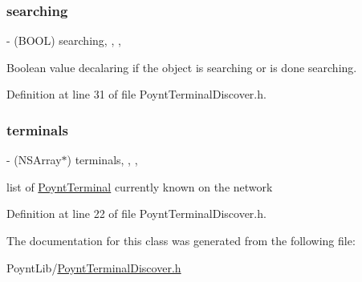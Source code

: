 \subsubsection{\texorpdfstring{searching}{searching}}
{\footnotesize\ttfamily -\/ (B\+O\+OL) searching\hspace{0.3cm}{\ttfamily [read]}, {\ttfamily [write]}, {\ttfamily [nonatomic]}, {\ttfamily [assign]}}



Boolean value decalaring if the object is searching or is done searching. 



Definition at line 31 of file Poynt\+Terminal\+Discover.\+h.

\hypertarget{interface_poynt_terminal_discover_a5388c2786127d007a5b553986779ee46}{}\label{interface_poynt_terminal_discover_a5388c2786127d007a5b553986779ee46} 
\subsubsection{\texorpdfstring{terminals}{terminals}}
{\footnotesize\ttfamily -\/ (N\+S\+Array$\ast$) terminals\hspace{0.3cm}{\ttfamily [read]}, {\ttfamily [write]}, {\ttfamily [nonatomic]}, {\ttfamily [strong]}}



list of \hyperlink{interface_poynt_terminal}{Poynt\+Terminal} currently known on the network 



Definition at line 22 of file Poynt\+Terminal\+Discover.\+h.



The documentation for this class was generated from the following file\+:\begin{DoxyCompactItemize}
\item 
Poynt\+Lib/\hyperlink{_poynt_terminal_discover_8h}{Poynt\+Terminal\+Discover.\+h}\end{DoxyCompactItemize}
